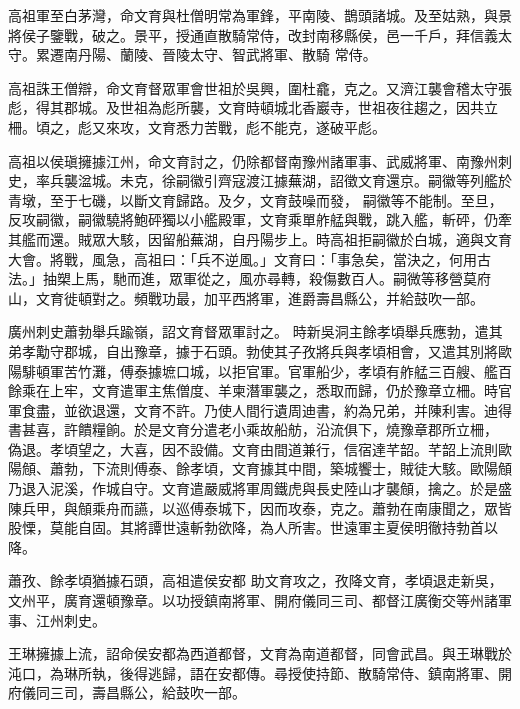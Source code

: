 \begin{pinyinscope}
 高祖軍至白茅灣，命文育與杜僧明常為軍鋒，平南陵、鵲頭諸城。及至姑熟，與景將侯子鑒戰，破之。景平，授通直散騎常侍，改封南移縣侯，邑一千戶，拜信義太守。累遷南丹陽、蘭陵、晉陵太守、智武將軍、散騎
 常侍。



 高祖誅王僧辯，命文育督眾軍會世祖於吳興，圍杜龕，克之。又濟江襲會稽太守張彪，得其郡城。及世祖為彪所襲，文育時頓城北香巖寺，世祖夜往趨之，因共立柵。頃之，彪又來攻，文育悉力苦戰，彪不能克，遂破平彪。



 高祖以侯瑱擁據江州，命文育討之，仍除都督南豫州諸軍事、武威將軍、南豫州刺史，率兵襲湓城。未克，徐嗣徽引齊寇渡江據蕪湖，詔徵文育還京。嗣徽等列艦於青墩，至于七磯，以斷文育歸路。及夕，文育鼓噪而發，
 嗣徽等不能制。至旦，反攻嗣徽，嗣徽驍將鮑砰獨以小艦殿軍，文育乘單舴艋與戰，跳入艦，斬砰，仍牽其艦而還。賊眾大駭，因留船蕪湖，自丹陽步上。時高祖拒嗣徽於白城，適與文育大會。將戰，風急，高祖曰：「兵不逆風。」文育曰：「事急矣，當決之，何用古法。」抽槊上馬，馳而進，眾軍從之，風亦尋轉，殺傷數百人。嗣微等移營莫府山，文育徙頓對之。頻戰功最，加平西將軍，進爵壽昌縣公，并給鼓吹一部。



 廣州刺史蕭勃舉兵踰嶺，詔文育督眾軍討之。
 時新吳洞主餘孝頃舉兵應勃，遣其弟孝勱守郡城，自出豫章，據于石頭。勃使其子孜將兵與孝頃相會，又遣其別將歐陽騑頓軍苦竹灘，傅泰據墌口城，以拒官軍。官軍船少，孝頃有舴艋三百艘、艦百餘乘在上牢，文育遣軍主焦僧度、羊柬潛軍襲之，悉取而歸，仍於豫章立柵。時官軍食盡，並欲退還，文育不許。乃使人間行遺周迪書，約為兄弟，并陳利害。迪得書甚喜，許饋糧餉。於是文育分遣老小乘故船舫，沿流俱下，燒豫章郡所立柵，
 偽退。孝頃望之，大喜，因不設備。文育由間道兼行，信宿達芊韶。芊韶上流則歐陽頠、蕭勃，下流則傅泰、餘孝頃，文育據其中間，築城饗士，賊徒大駭。歐陽頠乃退入泥溪，作城自守。文育遣嚴威將軍周鐵虎與長史陸山才襲頠，擒之。於是盛陳兵甲，與頠乘舟而讌，以巡傅泰城下，因而攻泰，克之。蕭勃在南康聞之，眾皆股慄，莫能自固。其將譚世遠斬勃欲降，為人所害。世遠軍主夏侯明徹持勃首以降。



 蕭孜、餘孝頃猶據石頭，高祖遣侯安都
 助文育攻之，孜降文育，孝頃退走新吳，文州平，廣育還頓豫章。以功授鎮南將軍、開府儀同三司、都督江廣衡交等州諸軍事、江州刺史。



 王琳擁據上流，詔命侯安都為西道都督，文育為南道都督，同會武昌。與王琳戰於沌口，為琳所執，後得逃歸，語在安都傳。尋授使持節、散騎常侍、鎮南將軍、開府儀同三司，壽昌縣公，給鼓吹一部。




\end{pinyinscope}
